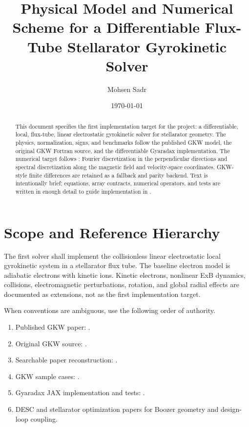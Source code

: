 \documentclass[11pt,a4paper]{article}
\title{Physical Model and Numerical Scheme for a Differentiable Flux-Tube Stellarator Gyrokinetic Solver}
\author{Mohsen Sadr}
\date{\today}
\begin{document}
\maketitle

\begin{abstract}
This document specifies the first implementation target for the project: a differentiable, local, flux-tube, linear electrostatic gyrokinetic solver for stellarator geometry.  The physics, normalization, signs, and benchmarks follow the published GKW model, the original GKW Fortran source, and the differentiable Gyaradax implementation.  The numerical target follows : Fourier discretization in the perpendicular directions and spectral discretization along the magnetic field and velocity-space coordinates.  GKW-style finite differences are retained as a fallback and parity backend.  Text is intentionally brief; equations, array contracts, numerical operators, and tests are written in enough detail to guide implementation in .
\end{abstract}

\tableofcontents

\section{Scope and Reference Hierarchy}

The first solver shall implement the collisionless linear electrostatic local gyrokinetic system in a stellarator flux tube.  The baseline electron model is adiabatic electrons with kinetic ions.  Kinetic electrons, nonlinear ExB dynamics, collisions, electromagnetic perturbations, rotation, and global radial effects are documented as extensions, not as the first implementation target.

When conventions are ambiguous, use the following order of authority.
\begin{enumerate}
  \item Published GKW paper: .
  \item Original GKW source: .
  \item Searchable paper reconstruction: .
  \item GKW sample cases: .
  \item Gyaradax JAX implementation and tests: .
  \item DESC and stellarator optimization papers for Boozer geometry and design-loop coupling.
\end{enumerate}
\end{document}
